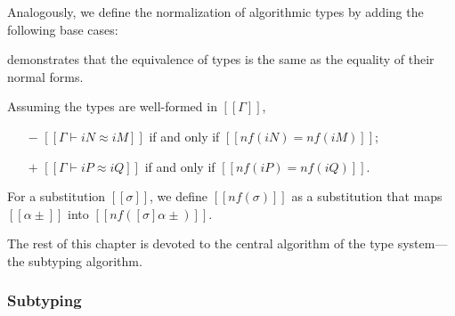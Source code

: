 \begin{algorithm}
  \label{alg:type-nf}
  \hfill

  \begin{minipage}[t]{0.48\textwidth}
    \ottdefnNrmNNormLabeled[\apppref]{}
  \end{minipage}%
  \hfill
  \begin{minipage}[t]{0.48\textwidth}
    \ottdefnNrmPNormLabeled[\apppref]{}
  \end{minipage}
  
  Analogously, we define the normalization of algorithmic types by adding the following base cases:

  \begin{minipage}[t]{0.48\textwidth}
    \ottdefnNrmuNNormLabeled[\apppref]{}
  \end{minipage}%
  \hfill
  \begin{minipage}[t]{0.48\textwidth}
    \ottdefnNrmuPNormLabeled[\apppref]{}
  \end{minipage}

\end{algorithm}

demonstrates that the equivalence of types is the same
as the equality of their normal forms.
\begin{theorempreview}
  Assuming the types are well-formed in $[[Γ]]$, 
  \begin{itemize}
    \item [$-$] $[[Γ ⊢ iN ≈ iM]]$ if and only if $[[nf(iN) = nf(iM)]]$;
    \item [$+$] $[[Γ ⊢ iP ≈ iQ]]$ if and only if $[[nf(iP) = nf(iQ)]]$.
  \end{itemize}
\end{theorempreview}


\begin{algorithm}
  For a substitution $[[σ]]$, we define $[[nf(σ)]]$
  as a substitution that maps $[[α±]]$ into $[[nf([σ]α±)]]$.
\end{algorithm}

The rest of this chapter is devoted to the
central algorithm of the type system---the subtyping algorithm. 

\subsubsection{Subtyping}
\label{sec:subtyping}

